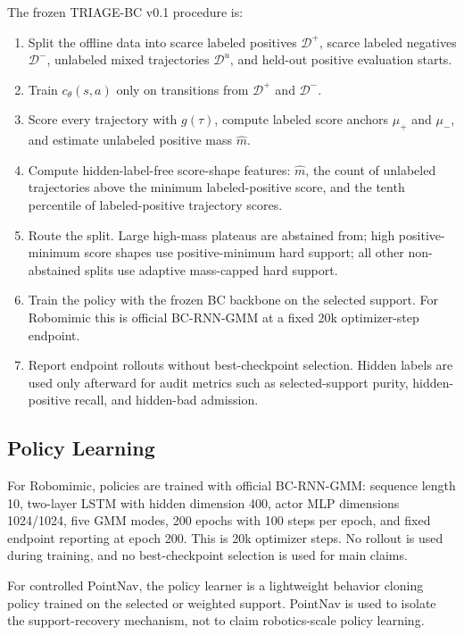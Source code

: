 \documentclass[11pt]{article}
\newcommand{\Dpos}{\mathcal{D}^{+}}
\newcommand{\Dneg}{\mathcal{D}^{-}}
\newcommand{\Dunl}{\mathcal{D}^{u}}
\newcommand{\method}{TRIAGE-BC}
\begin{document}
The frozen \method{} v0.1 procedure is:
\begin{enumerate}[leftmargin=*]
  \item Split the offline data into scarce labeled positives $\Dpos$, scarce labeled negatives $\Dneg$, unlabeled mixed trajectories $\Dunl$, and held-out positive evaluation starts.
  \item Train $c_\theta(s,a)$ only on transitions from $\Dpos$ and $\Dneg$.
  \item Score every trajectory with $g(\tau)$, compute labeled score anchors $\mu_+$ and $\mu_-$, and estimate unlabeled positive mass $\hat{m}$.
  \item Compute hidden-label-free score-shape features: $\hat{m}$, the count of unlabeled trajectories above the minimum labeled-positive score, and the tenth percentile of labeled-positive trajectory scores.
  \item Route the split. Large high-mass plateaus are abstained from; high positive-minimum score shapes use positive-minimum hard support; all other non-abstained splits use adaptive mass-capped hard support.
  \item Train the policy with the frozen BC backbone on the selected support. For Robomimic this is official BC-RNN-GMM at a fixed 20k optimizer-step endpoint.
  \item Report endpoint rollouts without best-checkpoint selection. Hidden labels are used only afterward for audit metrics such as selected-support purity, hidden-positive recall, and hidden-bad admission.
\end{enumerate}

\subsection{Policy Learning}

For Robomimic, policies are trained with official BC-RNN-GMM: sequence length 10, two-layer LSTM with hidden dimension 400, actor MLP dimensions 1024/1024, five GMM modes, 200 epochs with 100 steps per epoch, and fixed endpoint reporting at epoch 200. This is 20k optimizer steps. No rollout is used during training, and no best-checkpoint selection is used for main claims.

For controlled PointNav, the policy learner is a lightweight behavior cloning policy trained on the selected or weighted support. PointNav is used to isolate the support-recovery mechanism, not to claim robotics-scale policy learning.
\end{document}
